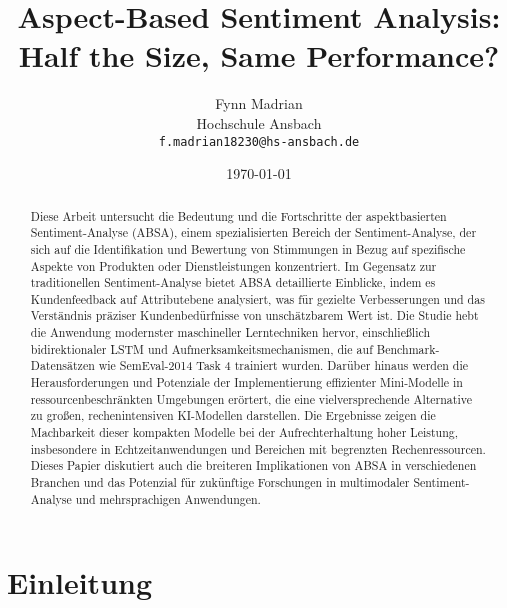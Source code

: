 \documentclass[12pt]{article}
\title{Aspect-Based Sentiment Analysis: Half the Size, Same Performance?}
\author{Fynn Madrian \\ Hochschule Ansbach \\ \texttt{f.madrian18230@hs-ansbach.de}}
\date{\today}
\begin{document}
\maketitle

\begin{abstract}
Diese Arbeit untersucht die Bedeutung und die Fortschritte der aspektbasierten Sentiment-Analyse (ABSA), einem spezialisierten Bereich der 
Sentiment-Analyse, der sich auf die Identifikation und Bewertung von Stimmungen in Bezug auf spezifische Aspekte von Produkten oder Dienstleistungen 
konzentriert. Im Gegensatz zur traditionellen Sentiment-Analyse bietet ABSA detaillierte Einblicke, indem es Kundenfeedback auf Attributebene 
analysiert, was für gezielte Verbesserungen und das Verständnis präziser Kundenbedürfnisse von unschätzbarem Wert ist. Die Studie hebt die 
Anwendung modernster maschineller Lerntechniken hervor, einschließlich bidirektionaler LSTM und Aufmerksamkeitsmechanismen, die auf 
Benchmark-Datensätzen wie SemEval-2014 Task 4 trainiert wurden. Darüber hinaus werden die Herausforderungen und Potenziale der Implementierung 
effizienter Mini-Modelle in ressourcenbeschränkten Umgebungen erörtert, die eine vielversprechende Alternative zu großen, rechenintensiven 
KI-Modellen darstellen. Die Ergebnisse zeigen die Machbarkeit dieser kompakten Modelle bei der Aufrechterhaltung hoher Leistung, insbesondere 
in Echtzeitanwendungen und Bereichen mit begrenzten Rechenressourcen. Dieses Papier diskutiert auch die breiteren Implikationen 
von ABSA in verschiedenen Branchen und das Potenzial für zukünftige Forschungen in multimodaler Sentiment-Analyse und mehrsprachigen 
Anwendungen.\end{abstract}

\section{Einleitung}
\end{document}
